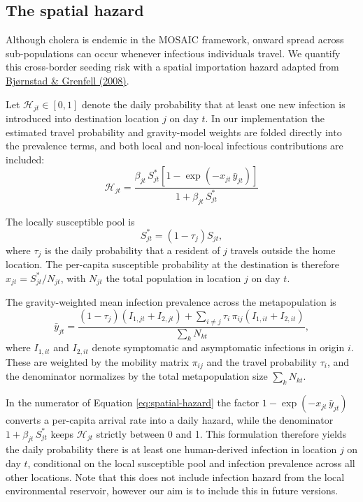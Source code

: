 \documentclass[
]{book}
\begin{document}
\subsection{The spatial hazard}\label{the-spatial-hazard}

Although cholera is endemic in the MOSAIC framework, onward spread across sub-populations can occur whenever infectious individuals travel. We quantify this cross-border seeding risk with a spatial importation hazard adapted from \href{http://link.springer.com/10.1007/s10651-007-0059-3}{Bjørnstad \& Grenfell (2008)}.

Let \(\mathcal{H}_{jt}\in[0,1]\) denote the daily probability that at least one new infection is introduced into destination location \(j\) on day \(t\). In our implementation the estimated travel probability and gravity-model weights are folded directly into the prevalence terms, and both local and non-local infectious contributions are included:
\begin{equation}
\mathcal{H}_{jt} =
\frac{\displaystyle
  \beta_{jt}\,S^{*}_{jt}
  \left[1-\exp\left(-x_{jt}\,\bar y_{jt}\right)\right]}
     {\displaystyle 1+\beta_{jt}\,S^{*}_{jt}}
\label{eq:spatial-hazard}
\end{equation}

The locally susceptible pool is
\begin{equation}
S^{*}_{jt}
  = \left(1-\tau_{j}\right) S_{jt},
\label{eq:susceptible-pool}
\end{equation}
where \(\tau_{j}\) is the daily probability that a resident of \(j\) travels outside the home location. The per-capita susceptible probability at the destination is therefore \(x_{jt} = S^{*}_{jt}/N_{jt}\), with \(N_{jt}\) the total population in location \(j\) on day \(t\).

The gravity-weighted mean infection prevalence across the metapopulation is
\begin{equation}
\bar y_{jt} =
\frac{\left(1-\tau_{j}\right)\left(I_{1,jt}+I_{2,jt}\right)
      +\sum_{i\neq j}\tau_{i}\,\pi_{ij}\left(I_{1,it}+I_{2,it}\right)}
     {\displaystyle \sum_{k} N_{kt}},
\label{eq:grav-prevalence}
\end{equation}
where \(I_{1,it}\) and \(I_{2,it}\) denote symptomatic and asymptomatic infections in origin \(i\). These are weighted by the mobility matrix \(\pi_{ij}\) and the travel probability \(\tau_{i}\), and the denominator normalizes by the total metapopulation size \(\sum_{k}N_{kt}\).

In the numerator of Equation \eqref{eq:spatial-hazard} the factor \(1-\exp(-x_{jt}\,\bar y_{jt})\) converts a per-capita arrival rate into a daily hazard, while the denominator \(1+\beta_{jt}\,S^{*}_{jt}\) keeps \(\mathcal{H}_{jt}\) strictly between 0 and 1. This formulation therefore yields the daily probability there is at least one human-derived infection in location \(j\) on day \(t\), conditional on the local susceptible pool and infection prevalence across all other locations. Note that this does not include infection hazard from the local environmental reservoir, however our aim is to include this in future versions.
\end{document}
